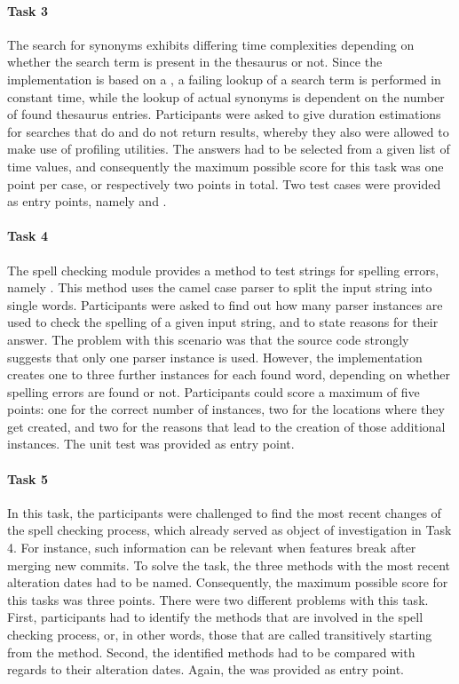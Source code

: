 \paragraph{Task 3} The search for synonyms exhibits differing time complexities depending on whether the search term is present in the thesaurus or not.
Since the implementation is based on a , a failing lookup of a search term is performed in constant time, while the lookup of actual synonyms is dependent on the number of found thesaurus entries.
Participants were asked to give duration estimations for searches that do and do not return results, whereby they also were allowed to make use of profiling utilities.
The answers had to be selected from a given list of time values, and consequently the maximum possible score for this task was one point per case, or respectively two points in total.
Two test cases were provided as entry points, namely  and .

\paragraph{Task 4} The spell checking module provides a method to test strings for spelling errors, namely .
This method uses the camel case parser to split the input string into single words.
Participants were asked to find out how many parser instances are used to check the spelling of a given input string, and to state reasons for their answer.
The problem with this scenario was that the source code strongly suggests that only one parser instance is used.
However, the implementation creates one to three further instances for each found word, depending on whether spelling errors are found or not.
Participants could score a maximum of five points: one for the correct number of instances, two for the locations where they get created, and two for the reasons that lead to the creation of those additional instances.
The unit test  was provided as entry point.

\paragraph{Task 5} In this task, the participants were challenged to find the most recent changes of the spell checking process, which already served as object of investigation in Task 4.
For instance, such information can be relevant when features break after merging new commits.
To solve the task, the three methods with the most recent alteration dates had to be named.
Consequently, the maximum possible score for this tasks was three points.
There were two different problems with this task.
First, participants had to identify the methods that are involved in the spell checking process, or, in other words, those that are called transitively starting from the  method.
Second, the identified methods had to be compared with regards to their alteration dates.
Again, the  was provided as entry point.


